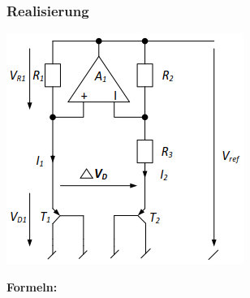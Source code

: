 \subsubsection{Realisierung}
\begin{minipage}[c]{0.25\textwidth}
	\includegraphics[width=1\linewidth]{chapters/Spannungsref/images/realisierung}
\end{minipage}
\begin{minipage}[c]{0.75\textwidth}
	\textbf{Formeln:}\\
	
\end{minipage}